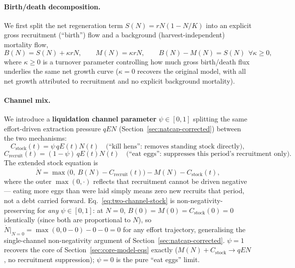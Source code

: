 \documentclass[twocolumn,10pt]{article}
\begin{document}
\paragraph{Birth/death decomposition.} We first split the net regeneration term $S(N)=rN(1-N/K)$ into an explicit gross recruitment (``birth'') flow and a background (harvest-independent) mortality flow,
\[
B(N) = S(N) + \kappa r N, \qquad M(N) = \kappa r N, \qquad B(N)-M(N)=S(N)\ \ \forall\kappa\ge0,
\]
where $\kappa\ge0$ is a turnover parameter controlling how much gross birth/death flux underlies the same net growth curve ($\kappa=0$ recovers the original model, with all net growth attributed to recruitment and no explicit background mortality).

\paragraph{Channel mix.} We introduce a \textbf{liquidation channel parameter} $\psi\in[0,1]$ splitting the same effort-driven extraction pressure $qEN$ (Section~\ref{sec:natcap-corrected}) between the two mechanisms:
\[
C_{\text{stock}}(t) = \psi\, qE(t)N(t) \quad\text{(``kill hens'': removes standing stock directly)},
\]
\[
C_{\text{recruit}}(t) = (1-\psi)\, qE(t)N(t) \quad\text{(``eat eggs'': suppresses this period's recruitment only)}.
\]
The extended stock equation is
\begin{equation}
\dot N = \max\bigl(0,\ B(N) - C_{\text{recruit}}(t)\bigr) - M(N) - C_{\text{stock}}(t),
\label{eq:two-channel-stock}
\end{equation}
where the outer $\max(0,\cdot)$ reflects that recruitment cannot be driven negative — eating more eggs than were laid simply means zero new recruits that period, not a debt carried forward. Eq.~\eqref{eq:two-channel-stock} is non-negativity-preserving for \emph{any} $\psi\in[0,1]$: at $N=0$, $B(0)=M(0)=C_{\text{stock}}(0)=0$ identically (since both are proportional to $N$), so $\dot N|_{N=0}=\max(0,0-0)-0-0=0$ for any effort trajectory, generalising the single-channel non-negativity argument of Section~\ref{sec:natcap-corrected}. $\psi=1$ recovers the core of Section~\ref{sec:core-model-eqs} exactly ($M(N)+C_{\text{stock}}\to qEN$, no recruitment suppression); $\psi=0$ is the pure ``eat eggs'' limit.
\end{document}
